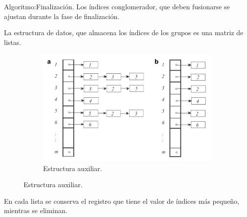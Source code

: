 
\begin{frame}[fragile]{Algoritmo:}{Finalización.}
  Los índices conglomerador, que deben fusionarse se ajustan durante la fase de finalización.

  La estructura de datos, que almacena los índices de los grupos es una matriz de listas.
  \begin{figure}
    \centering
    \begin{subfigure}[b]{0.6\textwidth}
      \includegraphics[width=\textwidth]{./Imagenes/FusionConglomerados.png}
      \caption*{Estructura auxiliar.}
    \end{subfigure}
  \end{figure}
  En cada lista se conserva el registro que tiene el valor de índices más pequeño, mientras se eliminan.
\end{frame}
